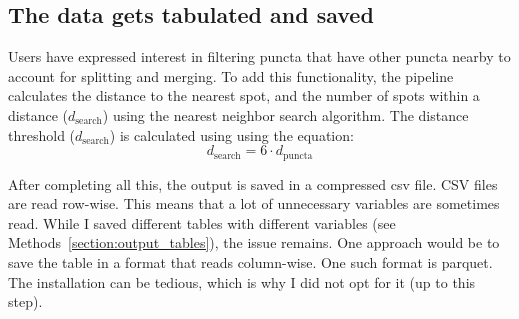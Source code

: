 \subsection{The data gets tabulated and saved}
Users have expressed interest in filtering puncta that have other puncta nearby to account for splitting and merging. To add this functionality, the pipeline calculates the distance to the nearest spot, and the number of spots within a distance ($d_\text{search}$) using the nearest neighbor search algorithm. The distance threshold ($d_\text{search}$) is calculated using using the equation:
\begin{equation*}
d_\text{search} = 6\cdot d_\text{puncta}
\end{equation*}

After completing all this, the output is saved in a compressed csv file. CSV files are read row-wise. This means that a lot of unnecessary variables are sometimes read. While I saved different tables with different variables (see Methods~\ref{section:output_tables}), the issue remains. One approach would be to save the table in a format that reads column-wise. One such format is parquet. The installation can be tedious, which is why I did not opt for it (up to this step).


